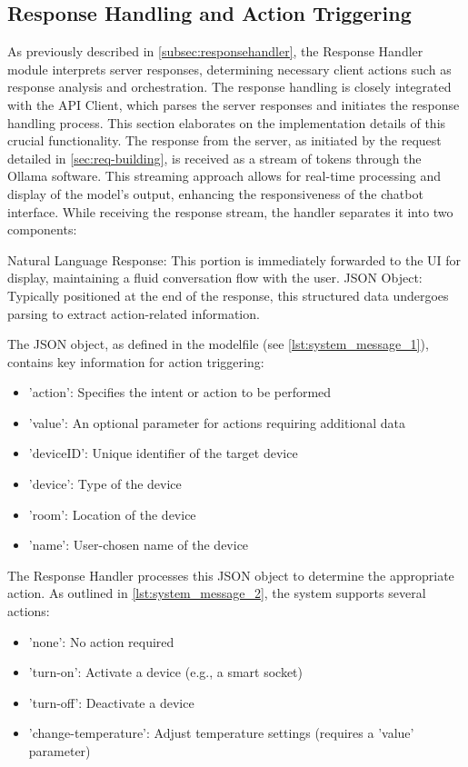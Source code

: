 \subsection{Response Handling and Action Triggering}
As previously described in \cref{subsec:responsehandler}, the Response Handler module interprets server responses, determining necessary client actions such as response analysis and orchestration. The response handling is closely integrated with the API Client, which parses the server responses and initiates the response handling process. This section elaborates on the implementation details of this crucial functionality.
The response from the server, as initiated by the request detailed in \cref{sec:req-building}, is received as a stream of tokens through the Ollama software. This streaming approach allows for real-time processing and display of the model's output, enhancing the responsiveness of the chatbot interface.
While receiving the response stream, the handler separates it into two components:

Natural Language Response: This portion is immediately forwarded to the UI for display, maintaining a fluid conversation flow with the user.
JSON Object: Typically positioned at the end of the response, this structured data undergoes parsing to extract action-related information.

The JSON object, as defined in the modelfile (see \cref{lst:system_message_1}), contains key information for action triggering:

\begin{itemize}
\item 'action': Specifies the intent or action to be performed
\item 'value': An optional parameter for actions requiring additional data
\item 'deviceID': Unique identifier of the target device
\item 'device': Type of the device
\item 'room': Location of the device
\item 'name': User-chosen name of the device
\end{itemize}

The Response Handler processes this JSON object to determine the appropriate action. As outlined in \cref{lst:system_message_2}, the system supports several actions:

\begin{itemize}
\item 'none': No action required
\item 'turn-on': Activate a device (e.g., a smart socket)
\item 'turn-off': Deactivate a device
\item 'change-temperature': Adjust temperature settings (requires a 'value' parameter)
\end{itemize}

